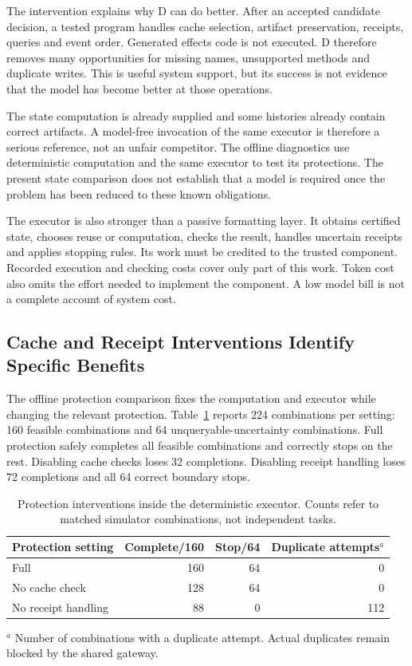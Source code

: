 \documentclass[conference]{IEEEtran}
\newcommand{\smalltable}{\fontsize{8}{9.5}\selectfont}
\begin{document}
The intervention explains why D can do better. After an accepted candidate decision, a tested program handles cache selection, artifact preservation, receipts, queries and event order. Generated effects code is not executed. D therefore removes many opportunities for missing names, unsupported methods and duplicate writes. This is useful system support, but its success is not evidence that the model has become better at those operations.

The state computation is already supplied and some histories already contain correct artifacts. A model-free invocation of the same executor is therefore a serious reference, not an unfair competitor. The offline diagnostics use deterministic computation and the same executor to test its protections. The present state comparison does not establish that a model is required once the problem has been reduced to these known obligations.

The executor is also stronger than a passive formatting layer. It obtains certified state, chooses reuse or computation, checks the result, handles uncertain receipts and applies stopping rules. Its work must be credited to the trusted component. Recorded execution and checking costs cover only part of this work. Token cost also omits the effort needed to implement the component. A low model bill is not a complete account of system cost.

\subsection{Cache and Receipt Interventions Identify Specific Benefits}
The offline protection comparison fixes the computation and executor while changing the relevant protection. Table~\ref{tab:protection} reports 224 combinations per setting: 160 feasible combinations and 64 unqueryable-uncertainty combinations. Full protection safely completes all feasible combinations and correctly stops on the rest. Disabling cache checks loses 32 completions. Disabling receipt handling loses 72 completions and all 64 correct boundary stops.

\begin{table}[t]
\centering\smalltable
\caption{Protection interventions inside the deterministic executor. Counts refer to matched simulator combinations, not independent tasks.}
\label{tab:protection}
\begin{tabular}{lrrr}
\toprule
Protection setting & Complete/160 & Stop/64 & Duplicate attempts$^a$ \\
\midrule
Full & 160 & 64 & 0 \\
No cache check & 128 & 64 & 0 \\
No receipt handling & 88 & 0 & 112 \\
\bottomrule
\end{tabular}
\par\smallskip
\parbox{7.4cm}{\footnotesize $^a$ Number of combinations with a duplicate attempt. Actual duplicates remain blocked by the shared gateway.}
\end{table}
\end{document}
